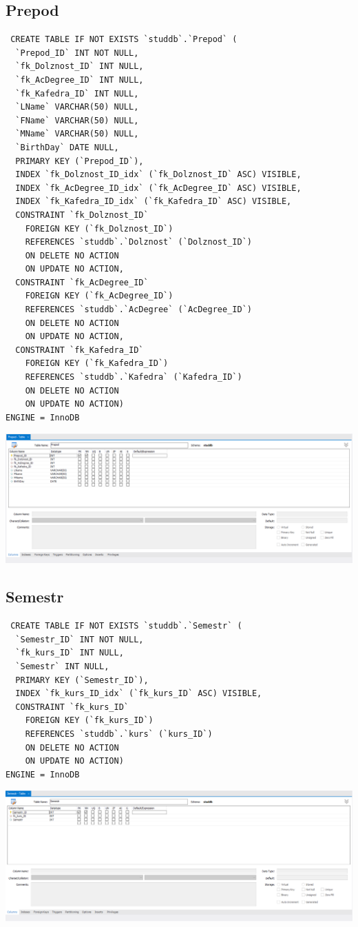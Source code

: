 \documentclass[a4paper, 12pt]{article}
\begin{document}
\subsection{Prepod}
\begin{lstlisting}
 CREATE TABLE IF NOT EXISTS `studdb`.`Prepod` (
  `Prepod_ID` INT NOT NULL,
  `fk_Dolznost_ID` INT NULL,
  `fk_AcDegree_ID` INT NULL,
  `fk_Kafedra_ID` INT NULL,
  `LName` VARCHAR(50) NULL,
  `FName` VARCHAR(50) NULL,
  `MName` VARCHAR(50) NULL,
  `BirthDay` DATE NULL,
  PRIMARY KEY (`Prepod_ID`),
  INDEX `fk_Dolznost_ID_idx` (`fk_Dolznost_ID` ASC) VISIBLE,
  INDEX `fk_AcDegree_ID_idx` (`fk_AcDegree_ID` ASC) VISIBLE,
  INDEX `fk_Kafedra_ID_idx` (`fk_Kafedra_ID` ASC) VISIBLE,
  CONSTRAINT `fk_Dolznost_ID`
    FOREIGN KEY (`fk_Dolznost_ID`)
    REFERENCES `studdb`.`Dolznost` (`Dolznost_ID`)
    ON DELETE NO ACTION
    ON UPDATE NO ACTION,
  CONSTRAINT `fk_AcDegree_ID`
    FOREIGN KEY (`fk_AcDegree_ID`)
    REFERENCES `studdb`.`AcDegree` (`AcDegree_ID`)
    ON DELETE NO ACTION
    ON UPDATE NO ACTION,
  CONSTRAINT `fk_Kafedra_ID`
    FOREIGN KEY (`fk_Kafedra_ID`)
    REFERENCES `studdb`.`Kafedra` (`Kafedra_ID`)
    ON DELETE NO ACTION
    ON UPDATE NO ACTION)
ENGINE = InnoDB 
\end{lstlisting}
\includegraphics[width=\textwidth]{2-11.png}

\subsection{Semestr}
\begin{lstlisting}
 CREATE TABLE IF NOT EXISTS `studdb`.`Semestr` (
  `Semestr_ID` INT NOT NULL,
  `fk_kurs_ID` INT NULL,
  `Semestr` INT NULL,
  PRIMARY KEY (`Semestr_ID`),
  INDEX `fk_kurs_ID_idx` (`fk_kurs_ID` ASC) VISIBLE,
  CONSTRAINT `fk_kurs_ID`
    FOREIGN KEY (`fk_kurs_ID`)
    REFERENCES `studdb`.`kurs` (`kurs_ID`)
    ON DELETE NO ACTION
    ON UPDATE NO ACTION)
ENGINE = InnoDB 
\end{lstlisting}
\includegraphics[width=\textwidth]{2-12.png}
\end{document}
